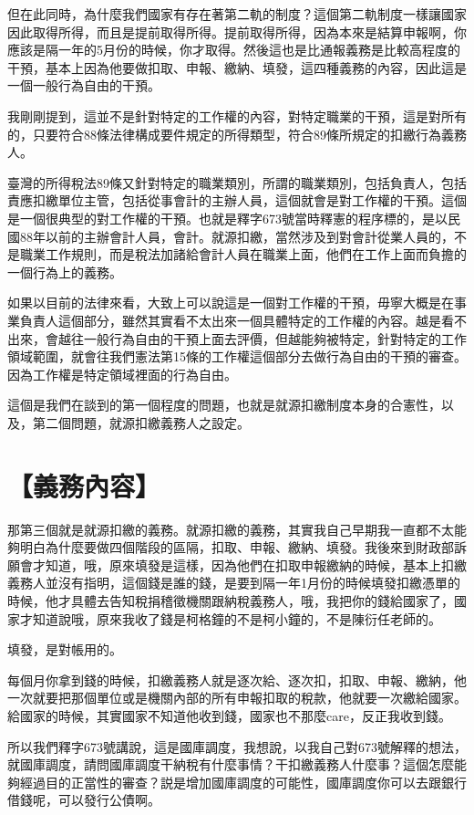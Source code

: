 \documentclass[]{ctexbook}
\begin{document}
但在此同時，為什麼我們國家有存在著第二軌的制度？這個第二軌制度一樣讓國家因此取得所得，而且是提前取得所得。提前取得所得，因為本來是結算申報啊，你應該是隔一年的5月份的時候，你才取得。然後這也是比通報義務是比較高程度的干預，基本上因為他要做扣取、申報、繳納、填發，這四種義務的內容，因此這是一個一般行為自由的干預。

我剛剛提到，這並不是針對特定的工作權的內容，對特定職業的干預，這是對所有的，只要符合88條法律構成要件規定的所得類型，符合89條所規定的扣繳行為義務人。

臺灣的所得稅法89條又針對特定的職業類別，所謂的職業類別，包括負責人，包括責應扣繳單位主管，包括從事會計的主辦人員，這個就會是對工作權的干預。這個是一個很典型的對工作權的干預。也就是釋字673號當時釋憲的程序標的，是以民國88年以前的主辦會計人員，會計。就源扣繳，當然涉及到對會計從業人員的，不是職業工作規則，而是稅法加諸給會計人員在職業上面，他們在工作上面而負擔的一個行為上的義務。

如果以目前的法律來看，大致上可以說這是一個對工作權的干預，毋寧大概是在事業負責人這個部分，雖然其實看不太出來一個具體特定的工作權的內容。越是看不出來，會越往一般行為自由的干預上面去評價，但越能夠被特定，針對特定的工作領域範圍，就會往我們憲法第15條的工作權這個部分去做行為自由的干預的審查。因為工作權是特定領域裡面的行為自由。

這個是我們在談到的第一個程度的問題，也就是就源扣繳制度本身的合憲性，以及，第二個問題，就源扣繳義務人之設定。

\hypertarget{ux7fa9ux52d9ux5167ux5bb9}{%
\section{【義務內容】}\label{ux7fa9ux52d9ux5167ux5bb9}}

那第三個就是就源扣繳的義務。就源扣繳的義務，其實我自己早期我一直都不太能夠明白為什麼要做四個階段的區隔，扣取、申報、繳納、填發。我後來到財政部訴願會才知道，哦，原來填發是這樣，因為他們在扣取申報繳納的時候，基本上扣繳義務人並沒有指明，這個錢是誰的錢，是要到隔一年1月份的時候填發扣繳憑單的時候，他才具體去告知稅捐稽徵機關跟納稅義務人，哦，我把你的錢給國家了，國家才知道說哦，原來我收了錢是柯格鐘的不是柯小鐘的，不是陳衍任老師的。

填發，是對帳用的。

每個月你拿到錢的時候，扣繳義務人就是逐次給、逐次扣，扣取、申報、繳納，他一次就要把那個單位或是機關內部的所有申報扣取的稅款，他就要一次繳給國家。給國家的時候，其實國家不知道他收到錢，國家也不那麼care，反正我收到錢。

所以我們釋字673號講說，這是國庫調度，我想說，以我自己對673號解釋的想法，就國庫調度，請問國庫調度干納稅有什麼事情？干扣繳義務人什麼事？這個怎麼能夠經過目的正當性的審查？説是增加國庫調度的可能性，國庫調度你可以去跟銀行借錢呢，可以發行公債啊。
\end{document}
